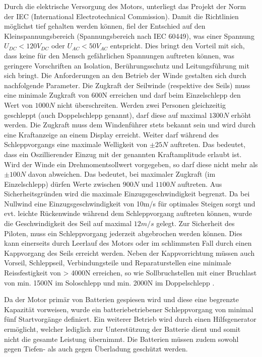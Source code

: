 Durch die elektrische Versorgung des Motors, unterliegt das Projekt der Norm der IEC (International Electrotechnical Commission). Damit die Richtlinien möglichst tief gehalten werden können, fiel der Entschied auf den Kleinspannungsbereich (Spannungsbereich  nach IEC 60449), was einer Spannung $U_{DC}<120V_{DC}$ oder $U_{AC}<50V_{AC}$ entspricht. Dies bringt den Vorteil mit sich, dass keine für den Mensch gefährlichen Spannungen auftreten können, was geringere Vorschriften an Isolation, Berührungsschutz und Leitungsführung mit sich bringt.
Die Anforderungen an den Betrieb der Winde gestalten sich durch nachfolgende Parameter. Die Zugkraft der Seilwinde (respektive des Seils) muss eine minimale Zugkraft von 600N erreichen und darf beim Einzelschlepp den Wert von $ 1000N $ nicht überschreiten. Werden zwei Personen gleichzeitig geschleppt (auch Doppelschlepp genannt), darf diese auf maximal $ 1300N $ erhöht werden. Die Zugkraft muss dem Windenführer stets bekannt sein und wird durch eine Kraftanzeige an einem Display erreicht.
Weiter darf während des Schleppvorgangs eine maximale Welligkeit von $\pm 25N$ auftreten. Das bedeutet, dass ein Oszillierender Einzug mit der genannten Kraftamplitude erlaubt ist. Wird der Winde ein Drehmomentsollwert vorgegeben, so darf diese nicht mehr als $\pm 100N$ davon abweichen. Das bedeutet, bei maximaler Zugkraft (im Einzelschlepp) dürfen Werte zwischen $ 900N $ und $ 1100N $ auftreten. Aus Sicherheitsgründen wird die maximale Einzugsgeschwindigkeit begrenzt. Da bei Nullwind eine Einzugsgeschwindigkeit von 10m/s für optimales Steigen sorgt und evt. leichte Rückenwinde während dem Schleppvorgang auftreten können, wurde die Geschwindigkeit des Seil auf maximal $ 12m/s $ gelegt.
Zur Sicherheit des Piloten, muss ein Schleppvorgang jederzeit abgebrochen werden können. Dies kann einerseits durch Leerlauf des Motors oder im schlimmsten Fall durch einen Kappvorgang des Seils erreicht werden. Neben der Kappvorrichtung müssen auch Vorseil, Schleppseil, Verbindungsteile und Reparaturstellen eine minimale Reissfestigkeit von > 4000N erreichen, so wie Sollbruchstellen mit einer Bruchlast von min. 1500N im Soloschlepp und min. 2000N im Doppelschlepp \cite{WindenPruefanweisung}.


Da der Motor primär von Batterien gespiesen wird und diese eine begrenzte Kapazität vorweisen, wurde ein batteriebetriebener Schleppvorgang von minimal fünf Startvorgänge definiert. Ein weiterer Betrieb wird durch einen Hilfsgenerator ermöglicht, welcher lediglich zur Unterstützung der Batterie dient und somit nicht die gesamte Leistung übernimmt. Die Batterien müssen zudem sowohl gegen Tiefen- als auch gegen Überladung geschützt werden.